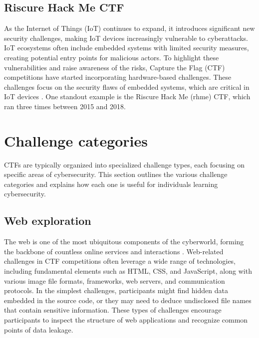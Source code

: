 \documentclass[conference]{IEEEtran}
\begin{document}
\subsection{Riscure Hack Me CTF}

As the Internet of Things (IoT) continues to expand, it introduces significant
new security challenges, making IoT devices increasingly vulnerable to
cyberattacks. IoT ecosystems often include embedded systems with limited
security measures, creating potential entry points for malicious actors. To
highlight these vulnerabilities and raise awareness of the risks, Capture the
Flag (CTF) competitions have started incorporating hardware-based challenges.
These challenges focus on the security flaws of embedded systems, which are
critical in IoT devices \cite{prinetto2020}. %
One standout example is the Riscure Hack Me (rhme) CTF, which ran three times
between 2015 and 2018.



\section{Challenge categories}
\label{sec-challenge-types}

CTFs are typically organized into specialized challenge types, each focusing on
specific areas of cybersecurity. This section outlines the various challenge
categories and explains how each one is useful for individuals learning
cybersecurity.

\subsection{Web exploration}

The web is one of the most ubiquitous components of the cyberworld, forming the
backbone of countless online services and interactions \cite{calzavara2017, jensen2009}.
Web-related challenges
in CTF competitions often leverage a wide range of technologies, including
fundamental elements such as HTML, CSS, and JavaScript, along with various
image file formats, frameworks, web servers, and communication protocols. In
the simplest challenges, participants might find hidden data embedded in the
source code, or they may need to deduce undisclosed file names that
contain sensitive information. These types of challenges encourage participants
to inspect the structure of web applications and recognize common points of
data leakage.
\end{document}
